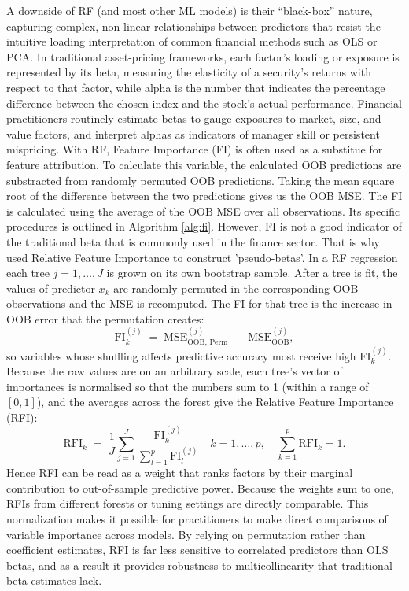 A downside of RF (and most other ML models) is their “black-box” nature, capturing complex, non-linear relationships between predictors that resist the intuitive loading interpretation of common financial methods such as OLS or PCA. In traditional asset-pricing frameworks, each factor's loading or exposure is represented by its beta, measuring the elasticity of a security's returns with respect to that factor, while alpha is the number that indicates the percentage difference between the chosen index and the stock's actual performance. Financial practitioners routinely estimate betas to gauge exposures to market, size, and value factors, and interpret alphas as indicators of manager skill or persistent mispricing. With RF, Feature Importance (FI) is often used as a substitue for feature attribution. To calculate this variable, the calculated OOB predictions are substracted from randomly permuted OOB predictions. Taking the mean square root of the difference between the two predictions gives us the OOB MSE. The FI is calculated using the average of the OOB MSE over all observations. Its specific procedures is outlined in Algorithm \ref{alg:fi}. However, FI is not a good indicator of the traditional beta that is commonly used in the finance sector. That is why  used Relative Feature Importance to construct 'pseudo-betas'. In a RF regression each tree \(j=1,\dots,J\) is grown on its own bootstrap sample. After a tree is fit, the values of predictor \(x_k\) are randomly permuted in the corresponding OOB observations and the MSE is recomputed. The FI for that tree is the increase in OOB error that the permutation creates:
\begin{equation}
\mathrm{FI}^{(j)}_{k}
\;=\;
\mathrm{MSE}^{(j)}_{\mathrm{OOB,\,Perm}}
\;-\;
\mathrm{MSE}^{(j)}_{\mathrm{OOB}},
\end{equation}
so variables whose shuffling affects predictive accuracy most receive high \(\mathrm{FI}^{(j)}_{k}\). Because the raw values are on an arbitrary scale, each tree's vector of importances is normalised so that the numbers sum to 1 (within a range of $[0,1]$), and the averages across the forest give the Relative Feature Importance (RFI):
\begin{equation}
\mathrm{RFI}_{k}
\;=\;
\frac{1}{J}
\sum_{j=1}^{J}
\frac{\mathrm{FI}^{(j)}_{k}}
     {\sum_{l=1}^{p}\mathrm{FI}^{(j)}_{l}}
\quad k=1,\dots,p,
\quad
\sum_{k=1}^{p}\mathrm{RFI}_{k}=1.
\end{equation}
Hence RFI can be read as a weight that ranks factors by their marginal contribution to out-of-sample predictive power. Because the weights sum to one, RFIs from different forests or tuning settings are directly comparable. This normalization makes it possible for practitioners to make direct comparisons of variable importance across models. By relying on permutation rather than coefficient estimates, RFI is far less sensitive to correlated predictors than OLS betas, and as a result it provides robustness to multicollinearity that traditional beta estimates lack. 


